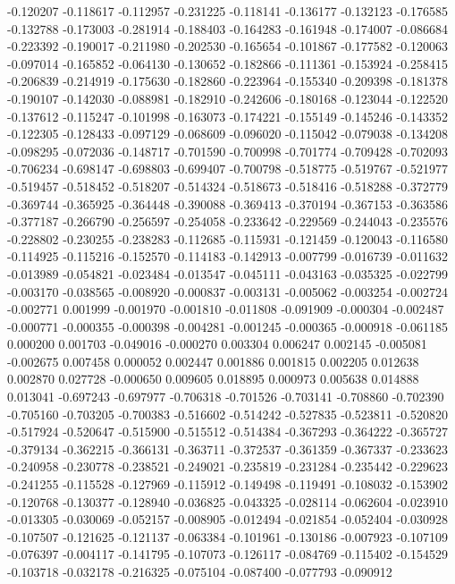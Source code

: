 -0.120207
-0.118617
-0.112957
-0.231225
-0.118141
-0.136177
-0.132123
-0.176585
-0.132788
-0.173003
-0.281914
-0.188403
-0.164283
-0.161948
-0.174007
-0.086684
-0.223392
-0.190017
-0.211980
-0.202530
-0.165654
-0.101867
-0.177582
-0.120063
-0.097014
-0.165852
-0.064130
-0.130652
-0.182866
-0.111361
-0.153924
-0.258415
-0.206839
-0.214919
-0.175630
-0.182860
-0.223964
-0.155340
-0.209398
-0.181378
-0.190107
-0.142030
-0.088981
-0.182910
-0.242606
-0.180168
-0.123044
-0.122520
-0.137612
-0.115247
-0.101998
-0.163073
-0.174221
-0.155149
-0.145246
-0.143352
-0.122305
-0.128433
-0.097129
-0.068609
-0.096020
-0.115042
-0.079038
-0.134208
-0.098295
-0.072036
-0.148717
-0.701590
-0.700998
-0.701774
-0.709428
-0.702093
-0.706234
-0.698147
-0.698803
-0.699407
-0.700798
-0.518775
-0.519767
-0.521977
-0.519457
-0.518452
-0.518207
-0.514324
-0.518673
-0.518416
-0.518288
-0.372779
-0.369744
-0.365925
-0.364448
-0.390088
-0.369413
-0.370194
-0.367153
-0.363586
-0.377187
-0.266790
-0.256597
-0.254058
-0.233642
-0.229569
-0.244043
-0.235576
-0.228802
-0.230255
-0.238283
-0.112685
-0.115931
-0.121459
-0.120043
-0.116580
-0.114925
-0.115216
-0.152570
-0.114183
-0.142913
-0.007799
-0.016739
-0.011632
-0.013989
-0.054821
-0.023484
-0.013547
-0.045111
-0.043163
-0.035325
-0.022799
-0.003170
-0.038565
-0.008920
-0.000837
-0.003131
-0.005062
-0.003254
-0.002724
-0.002771
0.001999
-0.001970
-0.001810
-0.011808
-0.091909
-0.000304
-0.002487
-0.000771
-0.000355
-0.000398
-0.004281
-0.001245
-0.000365
-0.000918
-0.061185
0.000200
0.001703
-0.049016
-0.000270
0.003304
0.006247
0.002145
-0.005081
-0.002675
0.007458
0.000052
0.002447
0.001886
0.001815
0.002205
0.012638
0.002870
0.027728
-0.000650
0.009605
0.018895
0.000973
0.005638
0.014888
0.013041
-0.697243
-0.697977
-0.706318
-0.701526
-0.703141
-0.708860
-0.702390
-0.705160
-0.703205
-0.700383
-0.516602
-0.514242
-0.527835
-0.523811
-0.520820
-0.517924
-0.520647
-0.515900
-0.515512
-0.514384
-0.367293
-0.364222
-0.365727
-0.379134
-0.362215
-0.366131
-0.363711
-0.372537
-0.361359
-0.367337
-0.233623
-0.240958
-0.230778
-0.238521
-0.249021
-0.235819
-0.231284
-0.235442
-0.229623
-0.241255
-0.115528
-0.127969
-0.115912
-0.149498
-0.119491
-0.108032
-0.153902
-0.120768
-0.130377
-0.128940
-0.036825
-0.043325
-0.028114
-0.062604
-0.023910
-0.013305
-0.030069
-0.052157
-0.008905
-0.012494
-0.021854
-0.052404
-0.030928
-0.107507
-0.121625
-0.121137
-0.063384
-0.101961
-0.130186
-0.007923
-0.107109
-0.076397
-0.004117
-0.141795
-0.107073
-0.126117
-0.084769
-0.115402
-0.154529
-0.103718
-0.032178
-0.216325
-0.075104
-0.087400
-0.077793
-0.090912
